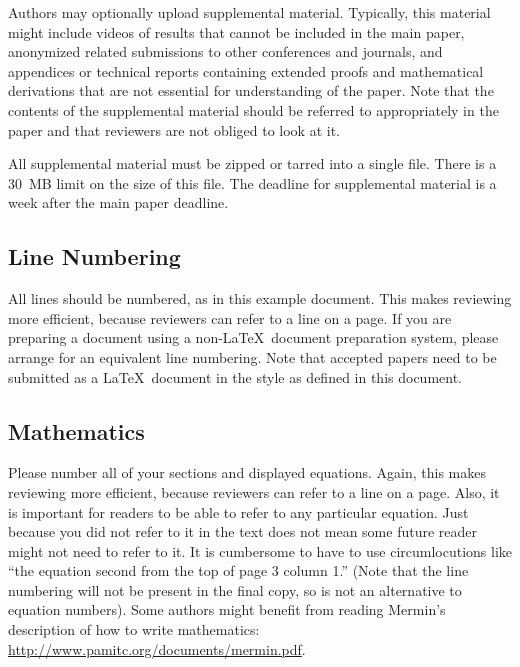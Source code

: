\documentclass[runningheads]{llncs}
\begin{document}
Authors may optionally upload supplemental material. Typically, this
material might include videos of results that cannot be included in
the main paper, anonymized related submissions to other conferences
and journals, and appendices or technical reports containing extended
proofs and mathematical derivations that are not essential for
understanding of the paper. Note that the contents of the supplemental
material should be referred to appropriately in the paper and that
reviewers are not obliged to look at it.

All supplemental material must be zipped or tarred into a single file. There is a 30~MB limit on the size of this file. The deadline for supplemental material is a week after the main paper deadline.

\subsection{Line Numbering}

All lines should be numbered, as in this example document. This makes
reviewing more efficient, because reviewers can refer to a line on a
page. If you are preparing a document using a non-\LaTeX\
document preparation system, please arrange for an equivalent line numbering. Note that accepted papers need to be submitted as a \LaTeX\
document in the style as defined in this document.

\subsection{Mathematics}

Please number all of your sections and displayed equations.  Again,
this makes reviewing more efficient, because reviewers can refer to a
line on a page.  Also, it is important for readers to be able to refer
to any particular equation.  Just because you did not refer to it in
the text does not mean some future reader might not need to refer to
it.  It is cumbersome to have to use circumlocutions like ``the
equation second from the top of page 3 column 1.''  (Note that the
line numbering will not be present in the final copy, so is not an
alternative to equation numbers).  Some authors might benefit from
reading Mermin's description of how to write mathematics:
\url{http://www.pamitc.org/documents/mermin.pdf}.

\end{document}
